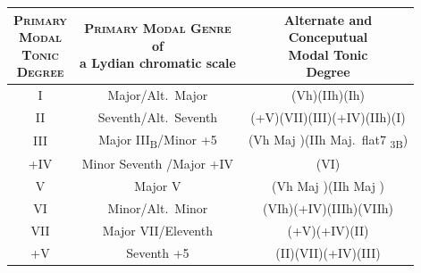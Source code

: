 \documentclass[b5paper,openany]{standalone}
\begin{document}
\newcommand{\LSChMScale}[1]{\begingroup\Huge #1\endgroup}%
\newcommand{\LSChMDegree}[1]{\begingroup\Large #1\endgroup}%
\newcommand{\LSChMWidth}{10em}%
\begin{tabular}{ccc}
\parbox{8em}{\centering\textsc{Primary\\Modal\\Tonic\\Degree}}
&\parbox{20em}{\centering\textsc{Primary Modal Genre}\\of\\a Lydian chromatic scale}
&\parbox{8em}{\centering Alternate and\\Conceputual\\Modal Tonic\\Degree}
\\ \hline
  I&Major/Alt.~Major&(Vh)(IIh)(Ih)\\
 II&Seventh/Alt.~Seventh&(+V)(VII)(III)(+IV)(IIh)(I)\\
III&Major III\textsubscript{B}/Minor +5&(Vh Maj )(IIh Maj.~flat7 \textsubscript{3B})\\
+IV&Minor Seventh /Major +IV&(VI)\\
  V&Major V&(Vh Maj )(IIh Maj )\\
 VI&Minor/Alt.~Minor&(VIh)(+IV)(IIIh)(VIIh)\\
VII&Major VII/Eleventh &(+V)(+IV)(II)\\
 +V&Seventh +5&(II)(VII)(+IV)(III)
\end{tabular}
\end{document}

